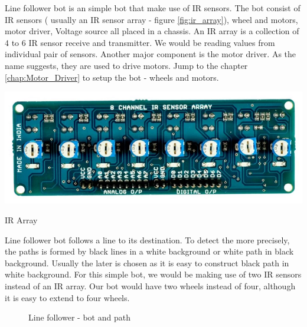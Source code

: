 \par Line follower bot is an simple bot that make use of \ac{IR} sensors. The bot consist of \ac{IR} sensors ( usually an \ac{IR} sensor array - figure \ref{fig:ir_array}), wheel and motors, motor driver, Voltage source all placed in a chassis. An \ac{IR} array is a collection of 4 to 6 \ac{IR} sensor receive and transmitter. We would be reading values from individual pair of sensors. Another major component is the motor driver. As the name suggests, they are used to drive motors. Jump to the chapter \ref{chap:Motor_Driver} to setup the bot - wheels and motors.

\begin{marginfigure}	
	\includegraphics{Images/IR Sensor/IR_array.png}
	\caption{\ac{IR} Array}
	\label{fig:ir_array}
\end{marginfigure}

Line follower bot follows a line to its destination. To detect the more precisely, the paths is formed by black lines in a white background or white path in black background. Usually the later is chosen as it is easy to construct black path in white background. For this simple bot, we would be making use of two \ac{IR} sensors instead of an \ac{IR} array. Our bot would have two wheels instead of four, although it is easy to extend to four wheels.

\begin{figure}
    \quad
    \caption{Line follower - bot and path}
\end{figure}

